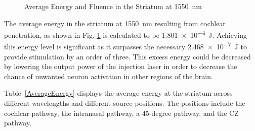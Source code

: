 \documentclass[journal,twoside,web]{ieeecolor}
\begin{document}
\begin{figure}[hbt]
    \caption{\label{fig:Avg1550} Average Energy and Fluence in the Striatum at 1550~nm}
\end{figure}


The average energy in the striatum at 1550~nm resulting from cochlear penetration, as shown in Fig. \ref{fig:Avg1550} is calculated to 
be \SI{1.801e-4}{\joule}. Achieving this energy level is significant as it surpasses the necessary \SI{2.468e-7}{\joule} to provide stimulation by an order of three. 
This excess energy could be decreased by lowering the output power of the injection laser in order to decrease the chance of unwanted neuron 
activation in other regions of the brain.

Table~\ref{AverageEnergy} displays the average energy at the striatum across different wavelengths and different source positions. The positions include the cochlear 
pathway, the intranasal pathway, a 45-degree pathway, and the CZ pathway.

\begin{table}[hbt!]
    \centering
    \caption{Average Energy at the Striatum}
    \label{AverageEnergy}
    \setlength{\tabcolsep}{3pt}
    \renewcommand{\arraystretch}{1.5}
\end{table}
\end{document}
